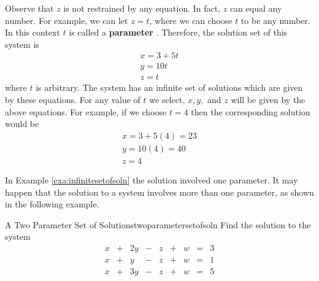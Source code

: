 \begin{solution}
Observe that $z$ is not restrained by any equation. In fact,
 $z$ can equal any number. For example, we can let $z = t$, where we can choose $t$ to be any number.
In this context $t$ is called a \textbf{parameter} . Therefore, the solution
set of this system is 
\[
\begin{array}{c}
x=3+5t \\
y=10t \\
z=t
\end{array}
\]
where $t$ is arbitrary. The system has an infinite set of solutions which are given by these equations. For any value of $t$ we select,
$x, y,$ and $z$ will be given by the above equations. For example, if we choose $t=4$ then the corresponding solution would be 
\[
\begin{array}{c}
x = 3 + 5 (4) = 23\\
y = 10(4)=40 \\
z=4
\end{array}
\]
\end{solution}

In Example \ref{exa:infinitesetofsoln} the solution involved one parameter. It may happen that the solution
to a system involves more than one parameter, as shown in the following example.

\begin{example}{A Two Parameter Set of Solutions}{twoparametersetofsoln}
Find the solution to the system
\begin{equation*}
\begin{array}{ccccccccc}
x&+&2y&-&z&+&w&=&3 \\
x&+&y&-&z&+&w&=&1 \\
x&+&3y&-&z&+&w&=&5
\end{array}
\end{equation*}
\end{example}

